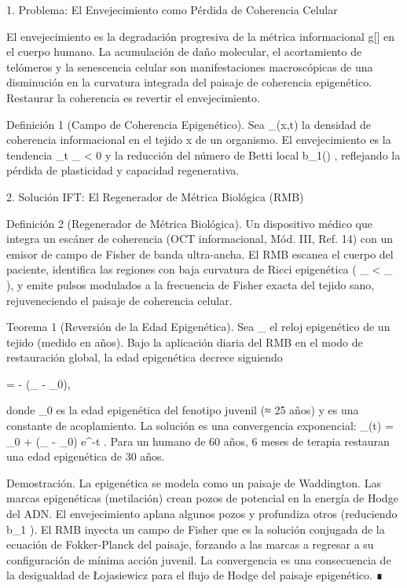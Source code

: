 \documentclass[12pt,twoside]{book}
\begin{document}
1. Problema: El Envejecimiento como Pérdida de Coherencia Celular

El envejecimiento es la degradación progresiva de la métrica informacional  g[\rho]  en el cuerpo humano. La acumulación de daño molecular, el acortamiento de telómeros y la senescencia celular son manifestaciones macroscópicas de una disminución en la curvatura integrada del paisaje de coherencia epigenético. Restaurar la coherencia es revertir el envejecimiento.

Definición 1 (Campo de Coherencia Epigenético). Sea  \rho_{}(x,t)  la densidad de coherencia informacional en el tejido  x  de un organismo. El envejecimiento es la tendencia  \partial_t \rho_{} < 0  y la reducción del número de Betti local  b_1() , reflejando la pérdida de plasticidad y capacidad regenerativa.

2. Solución IFT: El Regenerador de Métrica Biológica (RMB)

Definición 2 (Regenerador de Métrica Biológica). Un dispositivo médico que integra un escáner de coherencia (OCT informacional, Mód. III, Ref. 14) con un emisor de campo de Fisher de banda ultra-ancha. El RMB escanea el cuerpo del paciente, identifica las regiones con baja curvatura de Ricci epigenética (  _{} < _{}  ), y emite pulsos modulados a la frecuencia de Fisher exacta del tejido sano, rejuveneciendo el paisaje de coherencia celular.

Teorema 1 (Reversión de la Edad Epigenética). Sea  \tau_{}  el reloj epigenético de un tejido (medido en años). Bajo la aplicación diaria del RMB en el modo de restauración global, la edad epigenética decrece siguiendo

 = - \alpha (\tau_{} - \tau_0),

donde  \tau_0  es la edad epigenética del fenotipo juvenil (≈ 25 años) y  \alpha  es una constante de acoplamiento. La solución es una convergencia exponencial:  \tau_{}(t) = \tau_0 + (\tau_{} - \tau_0) e^{-\alpha t} . Para un humano de 60 años, 6 meses de terapia restauran una edad epigenética de 30 años.

Demostración. La epigenética se modela como un paisaje de Waddington. Las marcas epigenéticas (metilación) crean pozos de potencial en la energía de Hodge del ADN. El envejecimiento aplana algunos pozos y profundiza otros (reduciendo  b_1 ). El RMB inyecta un campo de Fisher que es la solución conjugada de la ecuación de Fokker‑Planck del paisaje, forzando a las marcas a regresar a su configuración de mínima acción juvenil. La convergencia es una consecuencia de la desigualdad de Łojasiewicz para el flujo de Hodge del paisaje epigenético. ∎
\end{document}
